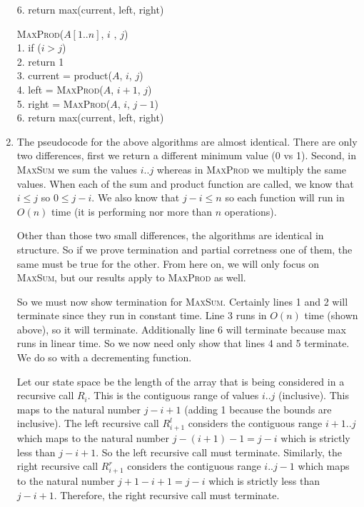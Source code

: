 \documentclass{article}
\begin{document}
\begin{enumerate}
\begin{algorithm}
            6. \hspace{1em} return max(current, left, right)
        \end{algorithm}
        \begin{algorithm}
            \textsc{MaxProd}($A[1..n]$, $i$ , $j$) \\
            1. \hspace{1em} if ($i > j$) \\
            2. \hspace{2em}     return 1 \\
            3. \hspace{1em} current = product($A$, $i$, $j$) \\
            4. \hspace{1em} left = \textsc{MaxProd}($A$, $i+1$, $j$) \\
            5. \hspace{1em} right = \textsc{MaxProd}($A$, $i$, $j-1$) \\
            6. \hspace{1em} return max(current, left, right)
        \end{algorithm}
    \item The pseudocode for the above algorithms are almost identical.
        There are only two differences, first we return a different minimum value (0 vs 1).
        Second, in \textsc{MaxSum} we sum the values $i..j$ whereas in \textsc{MaxProd} we multiply the same values.
        When each of the sum and product function are called, we know that $i \leq j$ so $0 \leq j-i$.
        We also know that $j-i \leq n$ so each function will run in $O (n)$ time (it is performing nor more than $n$ operations).

        Other than those two small differences, the algorithms are identical in structure.
        So if we prove termination and partial corretness one of them, the same must be true for the other.
        From here on, we will only focus on \textsc{MaxSum}, but our results apply to \textsc{MaxProd} as well.

        So we must now show termination for \textsc{MaxSum}.
        Certainly lines 1 and 2 will terminate since they run in constant time.
        Line 3 runs in $O(n)$ time (shown above), so it will terminate.
        Additionally line 6 will terminate because max runs in linear time.
        So we now need only show that lines 4 and 5 terminate.
        We do so with a decrementing function.

        Let our state space be the length of the array that is being considered in a recursive call $R_i$.
        This is the contiguous range of values $i..j$ (inclusive).
        This maps to the natural number $j-i+1$ (adding 1 because the bounds are inclusive).
        The left recursive call $R_{i+1}^l$ considers the contiguous range $i+1..j$ which maps to the natural number $j-(i+1)-1 = j-i$ which is strictly less than $j-i+1$.
        So the left recursive call must terminate.
        Similarly, the right recursive call $R_{i+1}^r$ considers the contiguous range $i..j-1$ which maps to the natural number $j+1-i+1 = j-i$ which is strictly less than $j-i+1$.
        Therefore, the right recursive call must terminate.


\end{enumerate}
\end{document}
